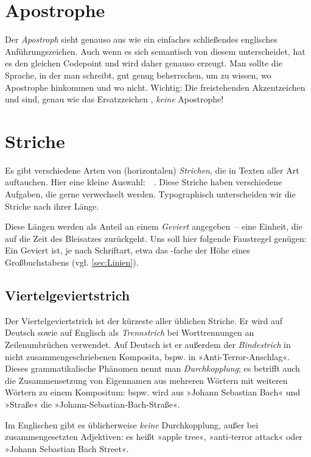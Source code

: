 \section{Apostrophe}

Der \emph{Apostroph}  sieht genauso aus wie ein einfaches schließendes
englisches Anführungszeichen. Auch wenn es sich semantisch von diesem
unterscheidet, hat es den gleichen Codepoint und wird daher genauso erzeugt.
Man sollte die Sprache, in der man schreibt, gut genug beherrschen, um zu
wissen, wo Apostrophe hinkommen und wo nicht.  Wichtig: Die freistehenden
Akzentzeichen \Char{\textasciigrave} und  sind, genau wie das
Ersatzzeichen \Char{\textquotesingle}, \emph{keine} Apostrophe!

\section{Striche}

Es gibt verschiedene Arten von (horizontalen) \emph{Strichen}, die in Texten
aller Art auftauchen.  Hier eine kleine Auswahl:
\Char{-}\,\Char{--}\,\Char{---}\,\Char{$-$}\,\Char{$=$}.  Diese Striche haben
verschiedene Aufgaben, die gerne verwechselt werden.  Typographisch
unterscheiden wir die Striche nach ihrer Länge.

Diese Längen werden als Anteil an einem \emph{Geviert} angegeben~--
eine Einheit, die auf die Zeit des Bleisatzes zurückgeht.  Uns soll
hier folgende Faustregel genügen: Ein Geviert ist, je nach Schriftart,
etwa das -fache der Höhe eines Großbuchstabens
(vgl. \cref{sec:Linien}).

\subsection{Viertelgeviertstrich}
\label{subsec:Viertel}

Der Viertelgeviertstrich \Char{-} ist der kürzeste aller üblichen
Striche.  Er wird auf Deutsch sowie auf Englisch als \emph{Trennstrich} bei
Worttrennungen an Zeilenumbrüchen verwendet.  Auf Deutsch ist er außerdem der
\emph{Bindestrich} in nicht zusammenge\-schriebenen Komposita, bspw. in
»Anti-Terror-Anschlag«.  Dieses grammatikalische Phänomen nennt man
\emph{Durchkopplung}; es betrifft auch die Zusammensetzung von Eigennamen aus
mehreren Wörtern mit weiteren Wörtern zu einem Kompositum: bspw. wird aus
»Johann Sebastian Bach« und »Straße« die »Johann-Sebastian-Bach-Straße«.

Im Englischen gibt es üblicherweise \emph{keine} Durchkopplung, außer
bei zusammengesetzten Adjektiven: es heißt »apple tree«, »anti-terror
attack« oder »Johann Sebastian Bach Street«.

